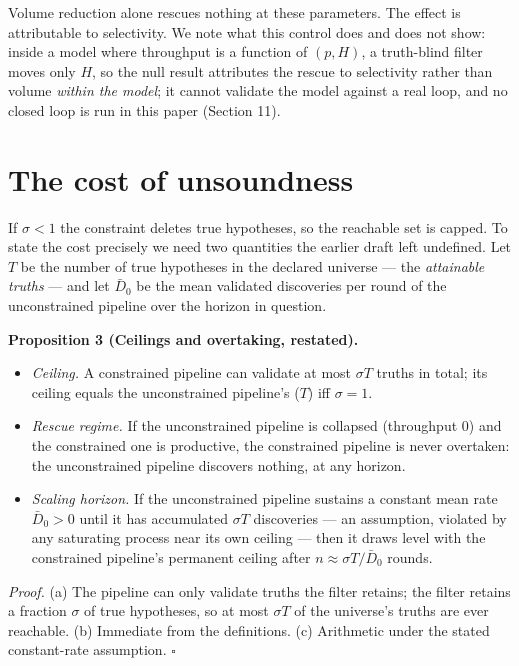 \documentclass[11pt]{article}
\begin{document}
Volume reduction alone rescues nothing at these parameters. The effect is
attributable to selectivity. We note what this control does and does not
show: inside a model where throughput is a function of $(p, H)$, a
truth-blind filter moves only $H$, so the null result attributes the rescue
to selectivity rather than volume \emph{within the model}; it cannot
validate the model against a real loop, and no closed loop is run in this
paper (Section 11).

\section{The cost of unsoundness}

If $\sigma < 1$ the constraint deletes true hypotheses, so the reachable set
is capped. To state the cost precisely we need two quantities the earlier
draft left undefined. Let $T$ be the number of true hypotheses in the
declared universe --- the \emph{attainable truths} --- and let $\bar D_0$ be
the mean validated discoveries per round of the unconstrained pipeline over
the horizon in question.

\medskip
\noindent\textbf{Proposition 3 (Ceilings and overtaking, restated).}
\begin{itemize}
\item[(a)] \emph{Ceiling.} A constrained pipeline can validate at most
$\sigma T$ truths in total; its ceiling equals the unconstrained
pipeline's ($T$) iff $\sigma = 1$.
\item[(b)] \emph{Rescue regime.} If the unconstrained pipeline is collapsed
(throughput $0$) and the constrained one is productive, the constrained
pipeline is never overtaken: the unconstrained pipeline discovers nothing,
at any horizon.
\item[(c)] \emph{Scaling horizon.} If the unconstrained pipeline sustains a
constant mean rate $\bar D_0 > 0$ until it has accumulated $\sigma T$
discoveries --- an assumption, violated by any saturating process near its
own ceiling --- then it draws level with the constrained pipeline's
permanent ceiling after $n \approx \sigma T / \bar D_0$ rounds.
\end{itemize}

\noindent\emph{Proof.} (a) The pipeline can only validate truths the filter
retains; the filter retains a fraction $\sigma$ of true hypotheses, so at
most $\sigma T$ of the universe's truths are ever reachable. (b) Immediate
from the definitions. (c) Arithmetic under the stated constant-rate
assumption. \hfill$\square$
\end{document}
